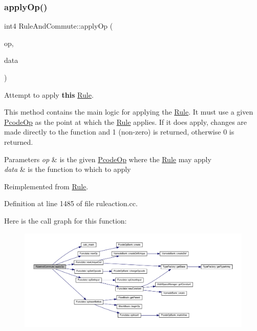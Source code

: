 \subsubsection{\texorpdfstring{applyOp()}{applyOp()}}
{\footnotesize\ttfamily int4 Rule\+And\+Commute\+::apply\+Op (\begin{DoxyParamCaption}\item[{\mbox{\hyperlink{class_pcode_op}{Pcode\+Op}} $\ast$}]{op,  }\item[{\mbox{\hyperlink{class_funcdata}{Funcdata}} \&}]{data }\end{DoxyParamCaption})\hspace{0.3cm}{\ttfamily [virtual]}}



Attempt to apply {\bfseries{this}} \mbox{\hyperlink{class_rule}{Rule}}. 

This method contains the main logic for applying the \mbox{\hyperlink{class_rule}{Rule}}. It must use a given \mbox{\hyperlink{class_pcode_op}{Pcode\+Op}} as the point at which the \mbox{\hyperlink{class_rule}{Rule}} applies. If it does apply, changes are made directly to the function and 1 (non-\/zero) is returned, otherwise 0 is returned. 
\begin{DoxyParams}{Parameters}
{\em op} & is the given \mbox{\hyperlink{class_pcode_op}{Pcode\+Op}} where the \mbox{\hyperlink{class_rule}{Rule}} may apply \\
\hline
{\em data} & is the function to which to apply \\
\hline
\end{DoxyParams}


Reimplemented from \mbox{\hyperlink{class_rule_a4e3e61f066670175009f60fb9dc60848}{Rule}}.



Definition at line 1485 of file ruleaction.\+cc.

Here is the call graph for this function\+:
\nopagebreak
\begin{figure}[H]
\begin{center}
\leavevmode
\includegraphics[width=350pt]{class_rule_and_commute_a4dd1bf0f7f55f84c7136a9fb4f44120f_cgraph}
\end{center}
\end{figure}
\mbox{\label{class_rule_and_commute_a21d46bfc5ca2a55556aa603e28b62497}} 

